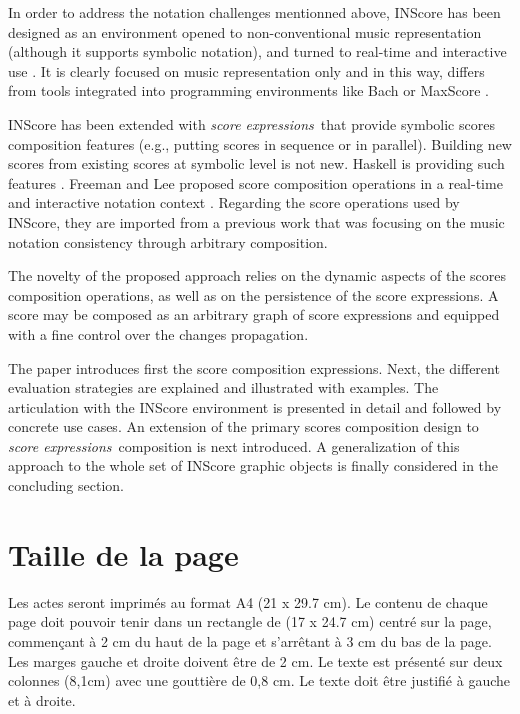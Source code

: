 \documentclass{article}
\newcommand{\sExpr}{\emph{score expressions}}
\begin{document}
In order to address the notation challenges mentionned above, INScore \cite{Fober:12a,fober14c} has been designed as an environment opened to non-conventional music representation (although it supports symbolic notation), and turned to real-time and interactive use \cite{Fober:13b, Fober:14b}. It is clearly focused on music representation only and in this way, differs from tools integrated into programming environments like Bach \cite{agostini12b} or MaxScore \cite{didko08}. 

INScore has been extended with \sExpr\ that provide symbolic scores composition features (e.g., putting scores in sequence or in parallel). Building new scores from existing scores at symbolic  level is not new. Haskell is providing such features \cite{Quick:2013:GAM:2505341.2505345}. Freeman and Lee proposed score composition operations in a real-time and interactive notation context \cite{Lee:2013}. Regarding the score operations used by INScore, they are imported from a previous work \cite{fober12b} that was focusing on the music notation consistency through arbitrary composition. 

The novelty of the proposed approach relies on the dynamic aspects of the scores composition operations, as well as on the persistence of the score expressions. A score may be composed as an arbitrary graph of score expressions and equipped with a fine control over the changes propagation.

The paper introduces first the score composition expressions. Next, the different evaluation strategies are explained and illustrated with examples. The articulation with the INScore environment is presented in detail and followed by concrete use cases. An extension of the primary scores composition design to \sExpr\ composition is next introduced. A generalization of this approach to the whole set of INScore graphic objects is finally considered in the concluding section.  



\section{Taille de la page}\label{sec:page_size}

Les actes seront imprimés au format A4 (21 x 29.7 cm). Le contenu de chaque page doit pouvoir tenir dans un rectangle de (17 x 24.7 cm) centré sur la page, commençant à 2 cm du haut de la page et s'arrêtant à  3 cm du bas de la page. Les marges gauche et droite doivent être de 2 cm. Le texte est présenté sur deux colonnes (8,1cm) avec une gouttière  de 0,8 cm. Le texte doit être justifié à gauche et à droite.
\end{document}
